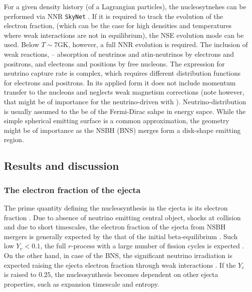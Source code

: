 \documentclass[11pt,a4paper,headinclude=true,DIV=14,BCOR=8mm,chapterprefix,listof=totoc,twoside,openright,abstracton]{scrbook}
\begin{document}
For a given density history (of a Lagrangian particles), the nucleosytnehes can be performed via NNR \texttt{SkyNet} \cite{Lippuner and Roberts, 2015}. If it is required to track the evolution of the electron fraction, (which can be the case for high densities and temperatures where weak interactions are not in equilibrium), the NSE evolution mode can be used. Below $T\sim 7$GK, however, a full NNR evolution is required.
The inclusion of weak reactions, -- absorption of neutrinos and atin-neutrinos by electrons and positrons, and electrons and positions by free nucleons. The expression for neutrino capture rate is complex, which requires different distribution functions for electrons and positrons. In its applied form it does not include momentum transfer to the nucleons and neglects weak magnetism corrections (note however, that might be of importance for the neutrino-driven with \cite{Horowitz, 2002}). Neutrino-distribution is usually assumed to the be of the Fermi-Dirac sahpe in energy sapce. While the simple spherical emitting surface is a common approximation, the geometry might be of importance as the NSBH (BNS) merges form a disk-shape emitting region.


\subsection{Results and discussion}

\subsubsection{The electron fraction of the ejecta}

The prime quantity defining the nucleosynthesis in the ejecta is its electron fraction \cite{(e.g., Lippuner and Roberts, 2015)}. Due to absence of neutrino emitting central object, shocks at collision and due to short timescales, the electron fraction of the ejecta from NSBH mergers is generally expected by the that of the initial beta-equilibrium \cite{Just et al., 2015}. Such low  $Y_e < 0.1$, the full $r$-process with a large number of fission cycles is expected  \cite{(e.g. Kasen et al., 2015; Lippuner and Roberts, 2015)}. On the other hand, in case of the BNS, the significant neutrino irradiation is expected raising the ejecta electron fraction through weak interactions \cite{Wanajo et al., 2014; Goriely et al., 2015; Foucart et al., 2016a; Palenzuela et al., 2015; Radice et al., 2016}. If the $Y_e$ is raised to $0.25$, the nucleosynthesis becomes dependent on other ejecta properties, such as expansion timescale and entropy. 
\end{document}
